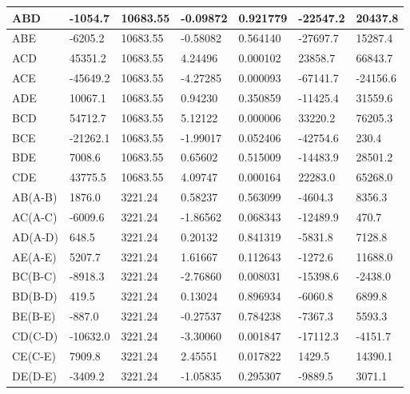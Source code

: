 \documentclass[materials,article,submit,pdftex,moreauthors]{Definitions/mdpi}
\begin{document}
\begin{ThreePartTable}
\begin{footnotesize}
\begin{longtable}{|l|l|l|l|l|l|l|}
        ABD & -1054.7 & 10683.55 & -0.09872 & 0.921779 & -22547.2 & 20437.8 \\ \hline
        ABE & -6205.2 & 10683.55 & -0.58082 & 0.564140 & -27697.7 & 15287.4 \\ \hline
        \rowcolor{LightCyan}
        ACD & 45351.2 & 10683.55 & 4.24496 & 0.000102 & 23858.7 & 66843.7 \\ \hline
        \rowcolor{LightCyan}
        ACE & -45649.2 & 10683.55 & -4.27285 & 0.000093 & -67141.7 & -24156.6 \\ \hline
        ADE & 10067.1 & 10683.55 & 0.94230 & 0.350859 & -11425.4 & 31559.6 \\ \hline
        \rowcolor{LightCyan}
        BCD & 54712.7 & 10683.55 & 5.12122 & 0.000006 & 33220.2 & 76205.3 \\ \hline
        BCE & -21262.1 & 10683.55 & -1.99017 & 0.052406 & -42754.6 & 230.4 \\ \hline
        BDE & 7008.6 & 10683.55 & 0.65602 & 0.515009 & -14483.9 & 28501.2 \\ \hline
        \rowcolor{LightCyan}
        CDE & 43775.5 & 10683.55 & 4.09747 & 0.000164 & 22283.0 & 65268.0 \\ \hline
        AB(A-B) & 1876.0 & 3221.24 & 0.58237 & 0.563099 & -4604.3 & 8356.3 \\ \hline
        AC(A-C) & -6009.6 & 3221.24 & -1.86562 & 0.068343 & -12489.9 & 470.7 \\ \hline
        AD(A-D) & 648.5 & 3221.24 & 0.20132 & 0.841319 & -5831.8 & 7128.8 \\ \hline
        AE(A-E) & 5207.7 & 3221.24 & 1.61667 & 0.112643 & -1272.6 & 11688.0 \\ \hline
        \rowcolor{LightCyan}
        BC(B-C) & -8918.3 & 3221.24 & -2.76860 & 0.008031 & -15398.6 & -2438.0 \\ \hline
        BD(B-D) & 419.5 & 3221.24 & 0.13024 & 0.896934 & -6060.8 & 6899.8 \\ \hline
        BE(B-E) & -887.0 & 3221.24 & -0.27537 & 0.784238 & -7367.3 & 5593.3 \\ \hline
        \rowcolor{LightCyan}
        CD(C-D) & -10632.0 & 3221.24 & -3.30060 & 0.001847 & -17112.3 & -4151.7 \\ \hline
        \rowcolor{LightCyan}
        CE(C-E) & 7909.8 & 3221.24 & 2.45551 & 0.017822 & 1429.5 & 14390.1 \\ \hline
        DE(D-E) & -3409.2 & 3221.24 & -1.05835 & 0.295307 & -9889.5 & 3071.1 \\ \hline
\end{longtable}
\end{footnotesize}
\end{ThreePartTable}
\end{document}
